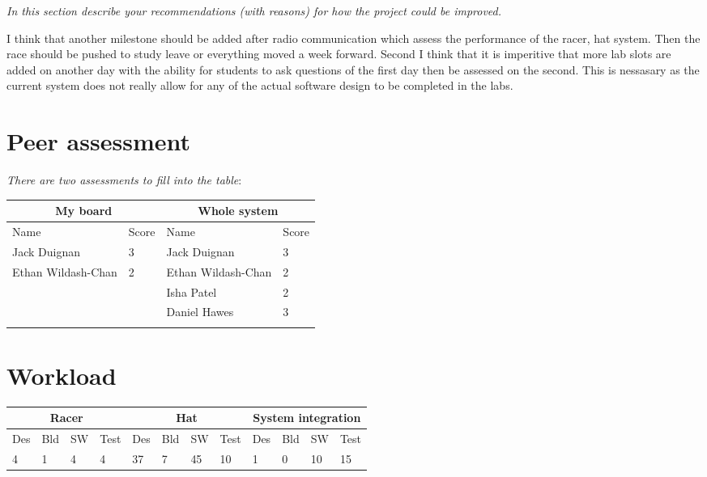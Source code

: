 \documentclass[a4paper,12pt]{article}
\newcommand{\comment}[1]{\emph{\color{blue}#1}}
\begin{document}
\comment{In this section describe your recommendations (with reasons) for
  how the project could be improved.}

I think that another milestone should be added after radio communication which assess the performance of the racer, hat system. Then the race should be pushed to study leave or everything moved a week forward. Second I think that it is imperitive that more lab slots are added on another day with the ability for students to ask questions of the first day then be assessed on the second. This is nessasary as the current system does not really allow for any of the actual software design to be completed in the labs.

\pagebreak
\section{Peer assessment}

\comment{There are two assessments to fill into the table}:

\noindent
\begin{tabular}{|l|l||l|l|}
\hline
\multicolumn{2}{|c||}{My board} & \multicolumn{2}{c|}{Whole system} \\
\hline
Name \hspace{5cm} & Score     & Name \hspace{5cm} & Score \\
\hline \hline
Jack Duignan        & 3 & Jack Duignan        &  3 \\ \hline
Ethan Wildash-Chan  & 2 & Ethan Wildash-Chan  &  2 \\ \hline
                    & & Isha Patel            &  2 \\ \cline{3-4}
                    & & Daniel Hawes          &  3 \\ \cline{3-4}
                    & &                       &    \\ \hline
\end{tabular}

\section{Workload}

\noindent
\begin{tabular}
  {|l|l|l|l||
    l|l|l|l||
    l|l|l|l|}
  \hline
  \multicolumn{4}{|c||}{Racer} &
  \multicolumn{4}{|c||}{Hat} &
  \multicolumn{4}{|c|}{System integration}  \\ \hline
    Des & Bld & SW & Test &
    Des & Bld & SW & Test &
    Des & Bld & SW & Test \\ \hline
    4 & 1 & 4 & 4 &
    37 & 7 & 45 & 10 &
    1 & 0 & 10 & 15 \\ \hline
\end{tabular}
\end{document}
